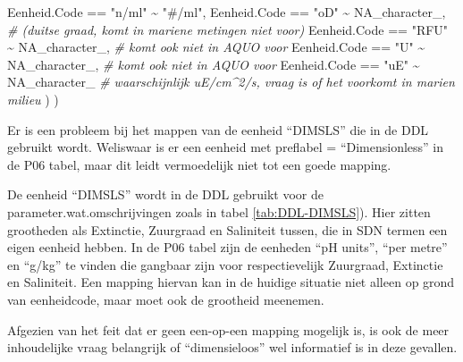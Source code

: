 \documentclass[
]{book}
\newenvironment{Shaded}{\begin{snugshade}}{\end{snugshade}}
\newcommand{\CommentTok}[1]{\textcolor[rgb]{0.56,0.35,0.01}{\textit{#1}}}
\newcommand{\ConstantTok}[1]{\textcolor[rgb]{0.00,0.00,0.00}{#1}}
\newcommand{\NormalTok}[1]{#1}
\newcommand{\SpecialCharTok}[1]{\textcolor[rgb]{0.00,0.00,0.00}{#1}}
\newcommand{\StringTok}[1]{\textcolor[rgb]{0.31,0.60,0.02}{#1}}
\begin{document}
\begin{Shaded}
\begin{Highlighting}[]
\NormalTok{             Eenheid.Code }\SpecialCharTok{==} \StringTok{"n/ml"} \SpecialCharTok{\textasciitilde{}} \StringTok{"\#/ml"}\NormalTok{,}
\NormalTok{             Eenheid.Code }\SpecialCharTok{==} \StringTok{"oD"} \SpecialCharTok{\textasciitilde{}} \ConstantTok{NA\_character\_}\NormalTok{,  }\CommentTok{\# (duitse graad, komt in mariene metingen niet voor)}
\NormalTok{             Eenheid.Code }\SpecialCharTok{==} \StringTok{"RFU"} \SpecialCharTok{\textasciitilde{}} \ConstantTok{NA\_character\_}\NormalTok{, }\CommentTok{\# komt ook niet in AQUO voor}
\NormalTok{             Eenheid.Code }\SpecialCharTok{==} \StringTok{"U"} \SpecialCharTok{\textasciitilde{}} \ConstantTok{NA\_character\_}\NormalTok{,   }\CommentTok{\# komt ook niet in AQUO voor}
\NormalTok{             Eenheid.Code }\SpecialCharTok{==} \StringTok{"uE"}  \SpecialCharTok{\textasciitilde{}} \ConstantTok{NA\_character\_}  \CommentTok{\# waarschijnlijk uE/cm\^{}2/s, vraag is of het voorkomt in marien milieu}
\NormalTok{           )}
\NormalTok{         )}
\end{Highlighting}
\end{Shaded}

Er is een probleem bij het mappen van de eenheid ``DIMSLS'' die in de DDL gebruikt wordt. Weliswaar is er een eenheid met preflabel = ``Dimensionless'' in de P06 tabel, maar dit leidt vermoedelijk niet tot een goede mapping.

De eenheid ``DIMSLS'' wordt in de DDL gebruikt voor de parameter.wat.omschrijvingen zoals in tabel \ref{tab:DDL-DIMSLS}). Hier zitten grootheden als Extinctie, Zuurgraad en Saliniteit tussen, die in SDN termen een eigen eenheid hebben. In de P06 tabel zijn de eenheden ``pH units'', ``per metre'' en ``g/kg'' te vinden die gangbaar zijn voor respectievelijk Zuurgraad, Extinctie en Saliniteit. Een mapping hiervan kan in de huidige situatie niet alleen op grond van eenheidcode, maar moet ook de grootheid meenemen.

Afgezien van het feit dat er geen een-op-een mapping mogelijk is, is ook de meer inhoudelijke vraag belangrijk of ``dimensieloos'' wel informatief is in deze gevallen.
\end{document}
